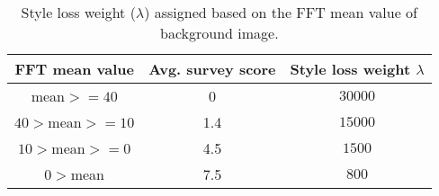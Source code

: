 \begin{figure}
\end{figure}

\begin{table}
\caption{Style loss weight ($\lambda$) assigned based on the FFT mean value of background image.}
\label{survey_weight}
\begin{center}
\begin{tabular}{ccc}
\toprule
    FFT mean value & Avg. survey score & Style loss weight $\lambda$\\
    \midrule
     mean$>=40$ & 0 & $30000$ \\
     $40>$mean$>=10$ & 1.4 & $15000$ \\
     $10>$mean$>=0$ & 4.5 & $1500$ \\
     $0>$mean & 7.5 & $800$ \\
\bottomrule
\end{tabular}
\end{center}
\end{table}
